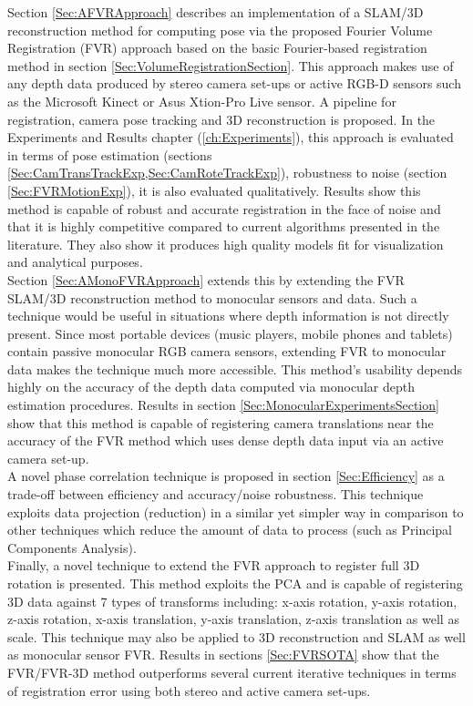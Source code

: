 Section \ref{Sec:AFVRApproach} describes an implementation of a SLAM/3D reconstruction method for computing pose via the proposed Fourier Volume Registration (FVR) approach based on the basic Fourier-based registration method in section \ref{Sec:VolumeRegistrationSection}. This approach makes use of any depth data produced by stereo camera set-ups or active RGB-D sensors such as the Microsoft Kinect or Asus Xtion-Pro Live sensor. A pipeline for registration, camera pose tracking and 3D reconstruction is proposed. In the Experiments and Results chapter (\ref{ch:Experiments}), this approach is evaluated in terms of pose estimation (sections \ref{Sec:CamTransTrackExp,Sec:CamRoteTrackExp}), robustness to noise (section \ref{Sec:FVRMotionExp}), it is also evaluated qualitatively. Results show this method is capable of robust and accurate registration in the face of noise and that it is highly competitive compared to current algorithms presented in the literature. They also show it produces high quality models fit for visualization and analytical purposes.  \\

Section \ref{Sec:AMonoFVRApproach} extends this by extending the FVR SLAM/3D reconstruction method to monocular sensors and data. Such a technique would be useful in situations where depth information is not directly present. Since most portable devices (music players, mobile phones and tablets) contain passive monocular RGB camera sensors, extending FVR to monocular data makes the technique much more accessible. This method's usability depends highly on the accuracy of the depth data computed via monocular depth estimation procedures. Results in section \ref{Sec:MonocularExperimentsSection} show that this method is capable of registering camera translations near the accuracy of the FVR method which uses dense depth data input via an active camera set-up.  \\

A novel phase correlation technique is proposed in section \ref{Sec:Efficiency} as a trade-off between efficiency and accuracy/noise robustness. This technique exploits data projection (reduction) in a similar yet simpler way in comparison to other techniques which reduce the amount of data to process (such as Principal Components Analysis). \\

Finally, a novel technique to extend the FVR approach to register full 3D rotation is presented. This method exploits the PCA and is capable of registering 3D data against 7 types of transforms including: x-axis rotation, y-axis rotation, z-axis rotation, x-axis translation, y-axis translation, z-axis translation as well as scale. This technique may also be applied to 3D reconstruction and SLAM as well as monocular sensor FVR. Results in sections \ref{Sec:FVRSOTA} show that the FVR/FVR-3D method outperforms several current iterative techniques in terms of registration error using both stereo and active camera set-ups.  \\